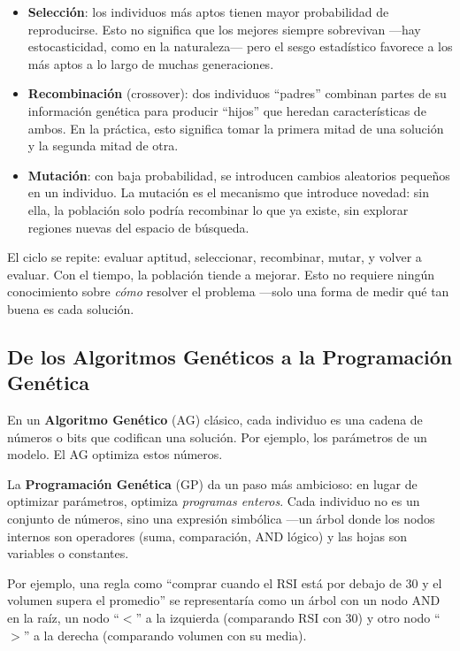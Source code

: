\documentclass[12pt,a4paper]{article}
\begin{document}
\begin{itemize}
\item \textbf{Selección}: los individuos más aptos tienen mayor probabilidad de
  reproducirse. Esto no significa que los mejores siempre sobrevivan ---hay
  estocasticidad, como en la naturaleza--- pero el sesgo estadístico favorece a los
  más aptos a lo largo de muchas generaciones.

\item \textbf{Recombinación} (crossover): dos individuos ``padres'' combinan partes
  de su información genética para producir ``hijos'' que heredan características de
  ambos. En la práctica, esto significa tomar la primera mitad de una solución y la
  segunda mitad de otra.

\item \textbf{Mutación}: con baja probabilidad, se introducen cambios aleatorios
  pequeños en un individuo. La mutación es el mecanismo que introduce novedad: sin
  ella, la población solo podría recombinar lo que ya existe, sin explorar regiones
  nuevas del espacio de búsqueda.
\end{itemize}

El ciclo se repite: evaluar aptitud, seleccionar, recombinar, mutar, y volver a
evaluar. Con el tiempo, la población tiende a mejorar. Esto no requiere ningún
conocimiento sobre \textit{cómo} resolver el problema ---solo una forma de medir
qué tan buena es cada solución.

\subsection{De los Algoritmos Genéticos a la Programación Genética}

En un \textbf{Algoritmo Genético} (AG) clásico, cada individuo es una cadena de
números o bits que codifican una solución. Por ejemplo, los parámetros de un modelo.
El AG optimiza estos números.

La \textbf{Programación Genética} (GP) da un paso más
ambicioso: en lugar de optimizar parámetros, optimiza \textit{programas enteros}.
Cada individuo no es un conjunto de números, sino una expresión simbólica ---un árbol
donde los nodos internos son operadores (suma, comparación, AND lógico) y las hojas
son variables o constantes.

Por ejemplo, una regla como ``comprar cuando el RSI está por debajo de 30 y el
volumen supera el promedio'' se representaría como un árbol con un nodo AND en la
raíz, un nodo ``$<$'' a la izquierda (comparando RSI con 30) y otro nodo ``$>$''
a la derecha (comparando volumen con su media).
\end{document}
